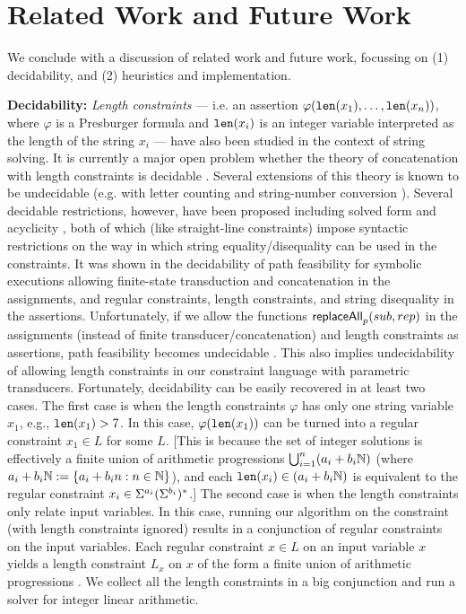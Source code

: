 \section{Related Work and Future Work}
\label{sec:related}

We conclude with a discussion of related work and future work, focussing on
(1) decidability, and (2) heuristics and implementation.

\smallskip
\noindent
\textbf{Decidability:}
\emph{Length constraints} --- i.e. an assertion 
$\varphi(\texttt{len}(x_1),\ldots,\texttt{len}(x_n))$, where $\varphi$ is a Presburger formula
and $\texttt{len}(x_i)$ is an integer variable interpreted as the length of the string
$x_i$ --- have also been studied in the context of string solving. It is
currently a major open problem whether the theory of concatenation with length
constraints is decidable \cite{Vijay-length}. Several extensions of this 
theory is known to be undecidable (e.g. with letter counting \cite{buchi} and
string-number conversion \cite{GB16}).
Several decidable restrictions, however,
have been proposed including solved form \cite{Vijay-length} and acyclicity 
\cite{Abdulla14}, both of which (like straight-line constraints) impose 
syntactic restrictions on the way in which string equality/disequality can be
used in the constraints. It was shown in \cite{LB16} the decidability of path 
feasibility for symbolic
executions allowing finite-state transduction and concatenation in the 
assignments, and regular constraints, length constraints, and string disequality
in the assertions. Unfortunately, if we allow the functions
$\mathsf{replaceAll}_p(sub,rep)$ in the assignments (instead of
finite transducer/concatenation) and length constraints as assertions, path
feasibility becomes undecidable \cite{CCHLW18}. This also implies undecidability
of allowing length constraints in our constraint language with parametric
transducers. Fortunately, decidability can be easily recovered in at least two
cases. The first case is when the length constraints $\varphi$ has only
one string variable $x_1$, e.g., $\texttt{len}(x_1) > 7$. In this case,
$\varphi(\texttt{len}(x_1))$ can be turned into a regular constraint $x_1 \in L$ for
some $L$. [This is because the set of integer solutions is effectively
a finite union of arithmetic progressions $\bigcup_{i=1}^n (a_i + b_i\mathbb{N})$
(where $a_i + b_i\mathbb{N} := \{ a_i + b_in : n \in \mathbb{N}\}$), and each 
$\texttt{len}(x_i) \in (a_i + b_i\mathbb{N})$ is equivalent to the regular constraint 
$x_i \in \Sigma^{a_i} (\Sigma^{b_i})^*$.] The second case is when
the length constraints only relate input variables. In this case, running
our algorithm on the constraint (with length constraints ignored)
results in a conjunction of regular constraints on the input variables. Each
regular constraint $x \in L$ on an input variable $x$ yields a length
constraint $L_x$ on $x$ of the form a finite union of arithmetic progressions 
\cite{Kozen-automata}. We collect all the length constraints in a big
conjunction and run a solver for integer linear arithmetic.

